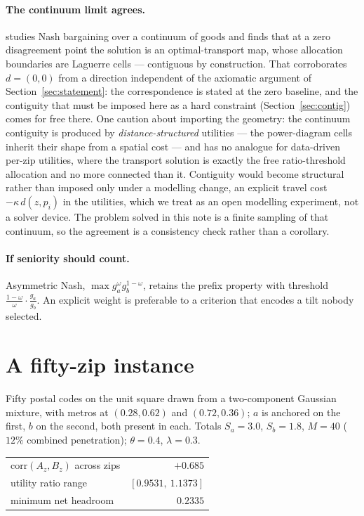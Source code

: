 \documentclass[11pt]{article}
\theoremstyle{remark}\newtheorem*{remark}{Remark}
\newcommand{\Sa}{S_a}\newcommand{\Sb}{S_b}\newcommand{\Amax}{G_a^{\max}}\newcommand{\Bmax}{G_b^{\max}}
\begin{document}
\paragraph{The continuum limit agrees.} \citet{warren2025} studies Nash bargaining
over a continuum of goods and finds that at a zero disagreement point the solution is an
optimal-transport map, whose allocation boundaries are Laguerre cells --- contiguous by
construction. That corroborates $d=(0,0)$ from a direction independent of the axiomatic
argument of Section~\ref{sec:statement}: the correspondence is stated at the zero
baseline, and the contiguity that must be imposed here as a hard constraint
(Section~\ref{sec:contig}) comes for free there. One caution about importing the
geometry: the continuum contiguity is produced by \emph{distance-structured} utilities
--- the power-diagram cells inherit their shape from a spatial cost --- and has no
analogue for data-driven per-zip utilities, where the transport solution is exactly the
free ratio-threshold allocation and no more connected than it. Contiguity would become
structural rather than imposed only under a modelling change, an explicit travel cost
$-\kappa\,d(z,p_i)$ in the utilities, which we treat as an open modelling experiment,
not a solver device. The problem solved in this note is a finite sampling of that
continuum, so the agreement is a consistency check rather than a corollary.

\paragraph{If seniority should count.} Asymmetric Nash,
$\max g_a^{\omega}g_b^{1-\omega}$, retains the prefix property with threshold
$\tfrac{1-\omega}{\omega}\cdot\tfrac{g_a}{g_b}$. An explicit weight is preferable to a
criterion that encodes a tilt nobody selected.

\section{A fifty-zip instance}\label{sec:instance}
Fifty postal codes on the unit square drawn from a two-component Gaussian mixture, with
metros at $(0.28,0.62)$ and $(0.72,0.36)$; $a$ is anchored on the first, $b$ on the
second, both present in each. Totals $\Sa=3.0$, $\Sb=1.8$, $M=40$ ($12\%$ combined
penetration); $\theta=0.4$, $\lambda=0.3$.

\begin{center}\begin{tabular}{lr}\toprule
$\mathrm{corr}(A_z,B_z)$ across zips & $+0.685$\\
utility ratio range & $[0.9531,\ 1.1373]$\\
minimum net headroom & $0.2335$\\
\bottomrule\end{tabular}\end{center}
\end{document}
